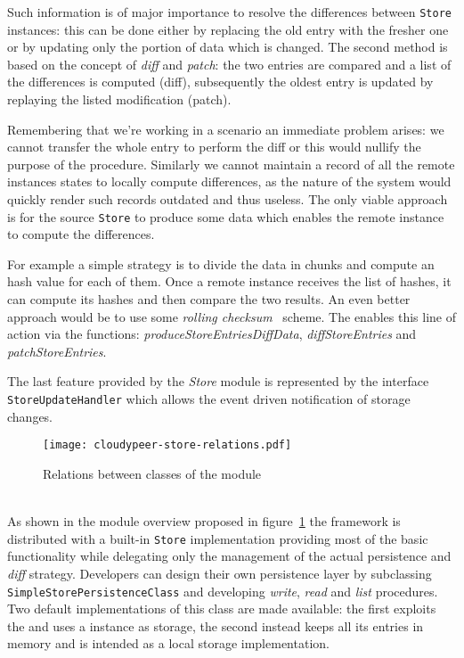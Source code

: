 Such information is of major importance to resolve the differences between
\texttt{Store} instances: this can be done either by replacing the old
entry with the fresher one or by updating only the portion of data
 which is changed. The second method is based on the
concept of \textit{diff} and \textit{patch}: the two entries are
compared and a list of the differences is computed (diff),
subsequently the oldest entry is updated by replaying the listed
modification (patch).

Remembering that we're working in a \ptop scenario an immediate
problem arises: we cannot transfer the whole entry to perform the
diff or this would nullify the purpose of the procedure. Similarly
we cannot maintain a record of all the remote instances states to
locally compute differences, as the
\ptop nature of the system would quickly render such records outdated
and thus useless. The only
viable approach is for the source \texttt{Store} to produce some data
which enables the remote instance to compute the differences.

For example a simple strategy is to divide the data in chunks and
compute an hash value for each of them. Once a remote instance receives
the list of hashes, it can compute its hashes and then
compare the two results. An even better approach would be to use some
\textit{rolling  checksum}~\cite{Rsync} scheme.
The \api enables this line of action via the functions:
\textit{produceStoreEntriesDiffData}, \textit{diffStoreEntries} and
\textit{patchStoreEntries}.

The last feature provided by the \textit{Store} module is represented
by the interface \texttt{StoreUpdateHandler} which allows the event
driven notification of storage changes.

\begin{figure}[h!]
  \centering
  \texttt{[image: cloudypeer-store-relations.pdf]}
  \caption{Relations between classes of the \cloudhelper module}
  \label{fig:cloudypeer-store-relations}
\end{figure}

\ \\
As shown in the module overview proposed in
figure~\ref{fig:cloudypeer-store-relations} the framework is
distributed with a built-in \texttt{Store} implementation providing
most of the basic functionality while delegating only the management of the
actual persistence and \textit{diff} strategy. Developers can design their
own persistence layer by subclassing
\texttt{Simple\-Store\-Persistence\-Class} and developing \textit{write}, \textit{read} and
\textit{list} procedures. Two default implementations of this class are
made available: the first exploits the \cloudhelper and uses a \cloud
instance as storage, the second instead keeps all its entries in
memory and is intended as a local storage implementation.

